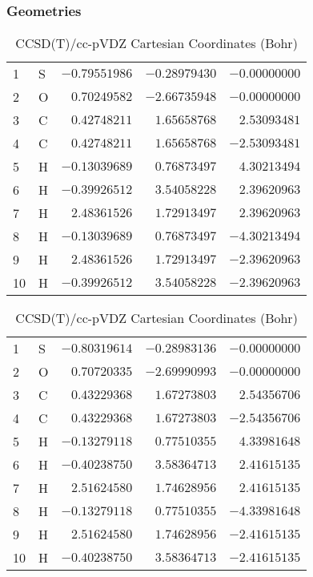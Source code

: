 \documentclass[10pt,oneside]{article}
\begin{document}
\clearpage

\subsection{}

\begin{table}[h!]
\subsubsection*{Geometries}
\begin{multicols}{2}
\centering
\caption{CCSD(T)/cc-pVTZ Cartesian Coordinates (Bohr)}
\begin{tabular}{llrrr}
\toprule
1  & S  & $-0.79551986$ & $-0.28979430$ & $-0.00000000$ \\
2  & O  & $ 0.70249582$ & $-2.66735948$ & $-0.00000000$ \\
3  & C  & $ 0.42748211$ & $ 1.65658768$ & $ 2.53093481$ \\
4  & C  & $ 0.42748211$ & $ 1.65658768$ & $-2.53093481$ \\
5  & H  & $-0.13039689$ & $ 0.76873497$ & $ 4.30213494$ \\
6  & H  & $-0.39926512$ & $ 3.54058228$ & $ 2.39620963$ \\
7  & H  & $ 2.48361526$ & $ 1.72913497$ & $ 2.39620963$ \\
8  & H  & $-0.13039689$ & $ 0.76873497$ & $-4.30213494$ \\
9  & H  & $ 2.48361526$ & $ 1.72913497$ & $-2.39620963$ \\
10 & H  & $-0.39926512$ & $ 3.54058228$ & $-2.39620963$ \\
\bottomrule
\end{tabular}
\caption{CCSD(T)/cc-pVDZ Cartesian Coordinates (Bohr)}
\begin{tabular}{llrrr}
\toprule
1  & S  & $-0.80319614$ & $-0.28983136$ & $-0.00000000$ \\
2  & O  & $ 0.70720335$ & $-2.69990993$ & $-0.00000000$ \\
3  & C  & $ 0.43229368$ & $ 1.67273803$ & $ 2.54356706$ \\
4  & C  & $ 0.43229368$ & $ 1.67273803$ & $-2.54356706$ \\
5  & H  & $-0.13279118$ & $ 0.77510355$ & $ 4.33981648$ \\
6  & H  & $-0.40238750$ & $ 3.58364713$ & $ 2.41615135$ \\
7  & H  & $ 2.51624580$ & $ 1.74628956$ & $ 2.41615135$ \\
8  & H  & $-0.13279118$ & $ 0.77510355$ & $-4.33981648$ \\
9  & H  & $ 2.51624580$ & $ 1.74628956$ & $-2.41615135$ \\
10 & H  & $-0.40238750$ & $ 3.58364713$ & $-2.41615135$ \\
\bottomrule
\end{tabular}
\end{multicols}
\end{table}
\end{document}
